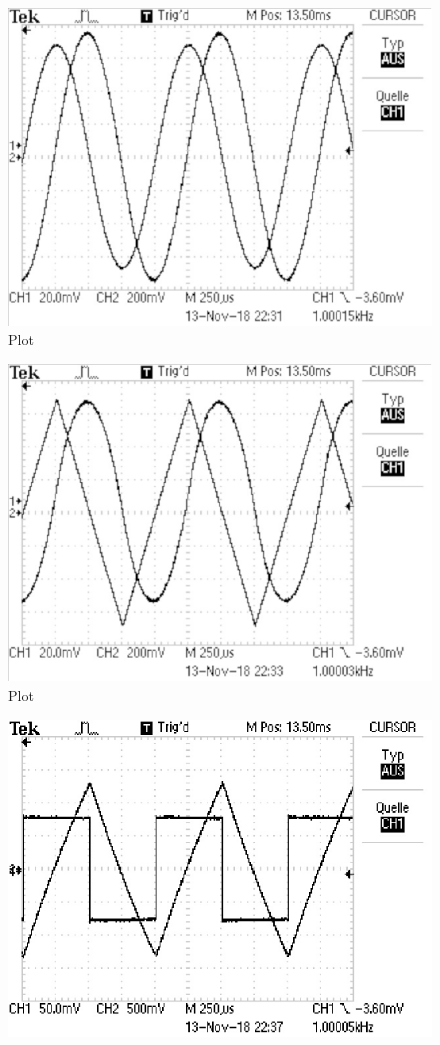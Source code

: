 \begin{figure}
  \centering
  \includegraphics{build/integrator1.pdf}
  \caption{Plot}
  \label{fig:plot}
\end{figure}
\begin{figure}
  \centering
  \includegraphics{build/integrator2.pdf}
  \caption{Plot}
  \label{fig:plot}
\end{figure}
\begin{figure}
  \centering
  \includegraphics{build/integrator3.pdf}
  \label{fig:plot}
\end{figure}
